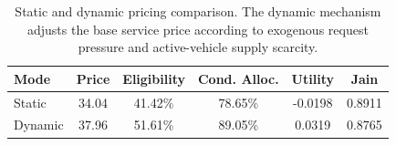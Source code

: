 \begin{table}[t]
\centering
\caption{Static and dynamic pricing comparison. The dynamic mechanism adjusts the base service price according to exogenous request pressure and active-vehicle supply scarcity.}
\label{tab:c25_pricing}
\begin{tabular}{lccccc}
\hline
Mode & Price & Eligibility & Cond. Alloc. & Utility & Jain \\
\hline
Static & 34.04 & 41.42\% & 78.65\% & -0.0198 & 0.8911 \\
Dynamic & 37.96 & 51.61\% & 89.05\% & 0.0319 & 0.8765 \\
\hline
\end{tabular}
\end{table}